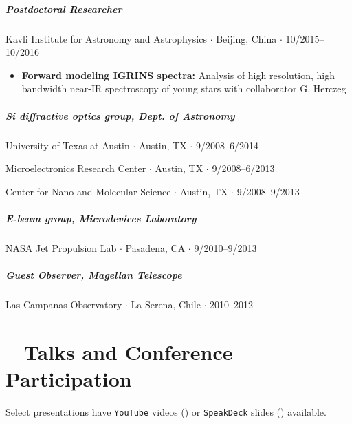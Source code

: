 \documentclass[10pt,letterpaper]{article}
\begin{document}
\subparagraph{Postdoctoral Researcher}
Kavli Institute for Astronomy and Astrophysics $\cdot$ Beijing, China $\cdot$ 10/2015--10/2016
\begin{itemize}
    \item  \textbf{Forward modeling IGRINS spectra:} Analysis of high resolution, high bandwidth near-IR spectroscopy of young stars with collaborator G. Herczeg
\end{itemize}

\subparagraph{Si diffractive optics group, Dept. of Astronomy}
University of Texas at Austin $\cdot$ Austin, TX $\cdot$ 9/2008--6/2014
\begin{flushright}
    Microelectronics Research Center $\cdot$ Austin, TX $\cdot$ 9/2008--6/2013

    Center for Nano and Molecular Science $\cdot$ Austin, TX $\cdot$ 9/2008--9/2013
\end{flushright}


\subparagraph{E-beam group, Microdevices Laboratory}
NASA Jet Propulsion Lab $\cdot$ Pasadena, CA $\cdot$ 9/2010--9/2013

\subparagraph{Guest Observer, Magellan Telescope}
Las Campanas Observatory $\cdot$ La Serena, Chile $\cdot$ 2010--2012


\section*{\faSlideshare ~ Talks and Conference Participation}

Select presentations have \texttt{YouTube} videos (\faYoutube) or \texttt{SpeakDeck} slides (\faSpeakerDeck) available.
\end{document}
